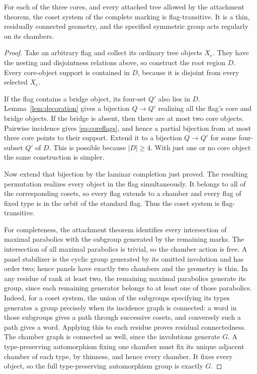 \begin{theorem}\label{thm:flags}
For each of the three cores, and every attached tree allowed by the
attachment theorem, the coset system of the complete marking is
flag-transitive. It is a thin, residually connected geometry, and the
specified symmetric group acts regularly on its chambers.
\end{theorem}
\begin{proof}
Take an arbitrary flag and collect its ordinary tree objects $X_e$.
They have the nesting and disjointness relations above, so construct
the root region $D$. Every core-object support is contained in $D$,
because it is disjoint from every selected $X_e$.

If the flag contains a bridge object, its four-set $Q'$ also lies in
$D$. Lemma~\ref{lem:decoration} gives a bijection $Q\to Q'$ realizing
all the flag's core and bridge objects. If the bridge is absent, then
there are at most two core objects. Pairwise incidence gives \eqref{eq:coreflags}, and
hence a partial bijection from at most three core points to their
support. Extend it to a bijection $Q\to Q'$ for some four-subset
$Q'$ of $D$. This is possible because $|D|\geq4$. With just one or no
core object the same construction is simpler.

Now extend that bijection by the laminar completion just proved. The
resulting permutation realizes every object in the flag simultaneously.
It belongs to all of the corresponding cosets, so every flag extends
to a chamber and every flag of fixed type is in the orbit of the
standard flag. Thus the coset system is flag-transitive.

For completeness, the attachment theorem identifies every intersection
of maximal parabolics with the subgroup generated by the remaining
marks. The intersection of all maximal parabolics is trivial, so the
chamber action is free. A panel stabilizer is the cyclic group generated
by its omitted involution and has order two; hence panels have exactly
two chambers and the geometry is thin. In any residue of rank at least
two, the remaining maximal parabolics generate its group, since each
remaining generator belongs to at least one of those parabolics.
Indeed, for a coset system, the union of the subgroups specifying
its types generates a group precisely when its incidence graph is
connected: a word in those subgroups gives a path through successive
cosets, and conversely such a path gives a word. Applying this to each
residue proves residual connectedness. The chamber graph is connected
as well, since the involutions generate $G$. A type-preserving
automorphism fixing one chamber must fix its unique adjacent chamber
of each type, by thinness, and hence every chamber. It fixes every
object, so the full type-preserving automorphism group is exactly $G$.
\end{proof}


